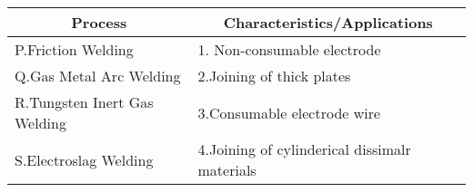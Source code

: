 \begin{tabular}{|l|l|}
\hline
\multicolumn{1}{|c|}{\textbf{Process}}    & \multicolumn{1}{|c|}{\textbf{Characteristics/Applications}} \\
\hline
P.Friction Welding   &1. Non-consumable electrode\\
\hline
Q.Gas Metal Arc Welding  &2.Joining of thick plates\\
\hline
R.Tungsten Inert Gas Welding &3.Consumable electrode wire\\
\hline
S.Electroslag Welding &4.Joining of cylinderical dissimalr materials\\

\hline
\end{tabular}